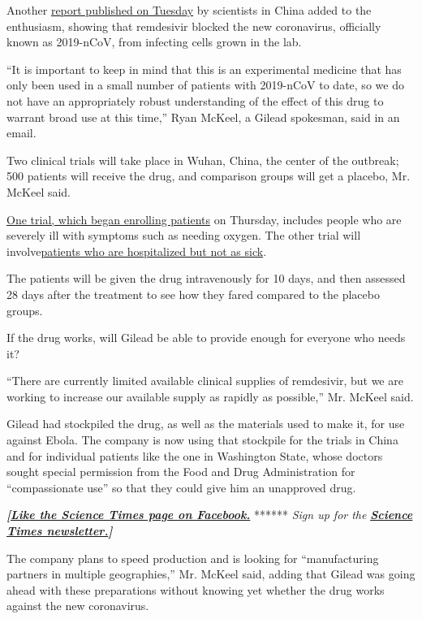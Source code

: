 Another \href{https://www.nature.com/articles/s41422-020-0282-0}{report
published on Tuesday} by scientists in China added to the enthusiasm,
showing that remdesivir blocked the new coronavirus, officially known as
2019-nCoV, from infecting cells grown in the lab.

``It is important to keep in mind that this is an experimental medicine
that has only been used in a small number of patients with 2019-nCoV to
date, so we do not have an appropriately robust understanding of the
effect of this drug to warrant broad use at this time,'' Ryan McKeel, a
Gilead spokesman, said in an email.

Two clinical trials will take place in Wuhan, China, the center of the
outbreak; 500 patients will receive the drug, and comparison groups will
get a placebo, Mr. McKeel said.

\href{https://clinicaltrials.gov/ct2/show/NCT04257656}{One trial, which
began enrolling patients} on Thursday, includes people who are severely
ill with symptoms such as needing oxygen. The other trial will
involve\href{https://clinicaltrials.gov/ct2/show/NCT04252664?term=remdesivir\&draw=2\&rank=1}{patients
who are hospitalized but not as sick}.

The patients will be given the drug intravenously for 10 days, and then
assessed 28 days after the treatment to see how they fared compared to
the placebo groups.

If the drug works, will Gilead be able to provide enough for everyone
who needs it?

``There are currently limited available clinical supplies of remdesivir,
but we are working to increase our available supply as rapidly as
possible,'' Mr. McKeel said.

Gilead had stockpiled the drug, as well as the materials used to make
it, for use against Ebola. The company is now using that stockpile for
the trials in China and for individual patients like the one in
Washington State, whose doctors sought special permission from the Food
and Drug Administration for ``compassionate use'' so that they could
give him an unapproved drug.

\textbf{\emph{{[}}\href{http://on.fb.me/1paTQ1h}{\emph{Like the Science
Times page on Facebook.}}} ****** \emph{\textbar{} Sign up for the}
\textbf{\href{http://nyti.ms/1MbHaRU}{\emph{Science Times
newsletter.}}\emph{{]}}}

The company plans to speed production and is looking for ``manufacturing
partners in multiple geographies,'' Mr. McKeel said, adding that Gilead
was going ahead with these preparations without knowing yet whether the
drug works against the new coronavirus.

